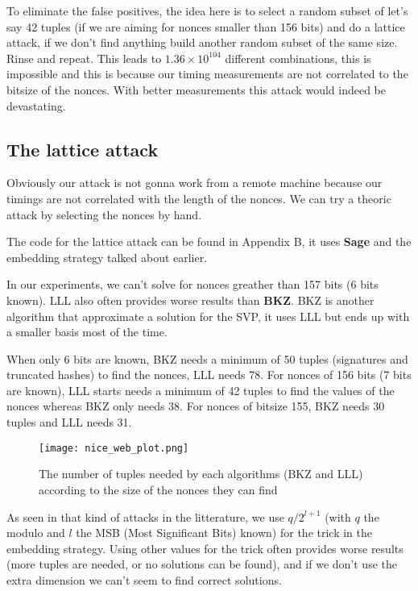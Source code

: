 \documentclass[a4paper,11pt]{article}
\begin{document}
To eliminate the false positives, the idea here is to select a random subset of let's say 42 tuples (if we are aiming for nonces smaller than 156 bits) and do a lattice attack, if we don't find anything build another random subset of the same size. Rinse and repeat. This leads to $1.36 \times 10^{104}$ different combinations, this is impossible and this is because our timing measurements are not correlated to the bitsize of the nonces. With better measurements this attack would indeed be devastating.

\subsection{The lattice attack}

Obviously our attack is not gonna work from a remote machine because our timings are not correlated with the length of the nonces. We can try a theoric attack by selecting the nonces by hand.

The code for the lattice attack can be found in Appendix B, it uses \textbf{Sage} and the embedding strategy talked about earlier.

In our experiments, we can't solve for nonces greather than 157 bits (6 bits known). LLL also often provides worse results than \textbf{BKZ}. BKZ is another algorithm that approximate a solution for the SVP, it uses LLL but ends up with a smaller basis most of the time.

When only 6 bits are known, BKZ needs a minimum of 50 tuples (signatures and truncated hashes) to find the nonces, LLL needs 78. For nonces of 156 bits (7 bits are known), LLL starts needs a minimum of 42 tuples to find the values of the nonces whereas BKZ only needs 38. For nonces of bitsize 155, BKZ needs 30 tuples and LLL needs 31.

\begin{figure}[H]
\texttt{[image: nice\_web\_plot.png]}
\caption{The number of tuples needed by each algorithms (BKZ and LLL) according to the size of the nonces they can find}
\end{figure}

As seen in that kind of attacks in the litterature, we use $q / 2^{l + 1}$ (with $q$ the modulo and $l$ the MSB (Most Significant Bits) known) for the trick in the embedding strategy. Using other values for the trick often provides worse results (more tuples are needed, or no solutions can be found), and if we don't use the extra dimension we can't seem to find correct solutions.
\end{document}
